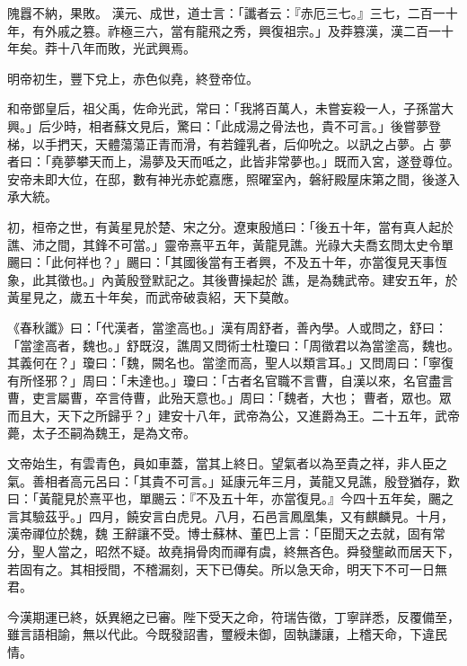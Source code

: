 \begin{pinyinscope}
 隗囂不納，果敗。
 漢元、成世，道士言：「讖者云：『赤厄三七。』三七，二百一十年，有外戚之篡。祚極三六，當有龍飛之秀，興復祖宗。」及莽篡漢，漢二百一十年矣。莽十八年而敗，光武興焉。



 明帝初生，豐下兌上，赤色似堯，終登帝位。



 和帝鄧皇后，祖父禹，佐命光武，常曰：「我將百萬人，未嘗妄殺一人，子孫當大興。」后少時，相者蘇文見后，驚曰：「此成湯之骨法也，貴不可言。」後嘗夢登梯，以手捫天，天體蕩蕩正青而滑，有若鐘乳者，后仰吮之。以訊之占夢。占
 夢者曰：「堯夢攀天而上，湯夢及天而呧之，此皆非常夢也。」既而入宮，遂登尊位。安帝未即大位，在邸，數有神光赤蛇嘉應，照曜室內，磐紆殿屋床第之間，後遂入承大統。



 初，桓帝之世，有黃星見於楚、宋之分。遼東殷馗曰：「後五十年，當有真人起於譙、沛之間，其鋒不可當。」靈帝熹平五年，黃龍見譙。光祿大夫喬玄問太史令單颺曰：「此何祥也？」颺曰：「其國後當有王者興，不及五十年，亦當復見天事恆象，此其徵也。」內黃殷登默記之。其後曹操起於
 譙，是為魏武帝。建安五年，於黃星見之，歲五十年矣，而武帝破袁紹，天下莫敵。



 《春秋讖》曰：「代漢者，當塗高也。」漢有周舒者，善內學。人或問之，舒曰：「當塗高者，魏也。」舒既沒，譙周又問術士杜瓊曰：「周徵君以為當塗高，魏也。其義何在？」瓊曰：「魏，闕名也。當塗而高，聖人以類言耳。」又問周曰：「寧復有所怪邪？」周曰：「未達也。」瓊曰：「古者名官職不言曹，自漢以來，名官盡言曹，吏言屬曹，卒言侍曹，此殆天意也。」周曰：「魏者，大也；
 曹者，眾也。眾而且大，天下之所歸乎？」建安十八年，武帝為公，又進爵為王。二十五年，武帝薨，太子丕嗣為魏王，是為文帝。



 文帝始生，有雲青色，員如車蓋，當其上終日。望氣者以為至貴之祥，非人臣之氣。善相者高元呂曰：「其貴不可言。」延康元年三月，黃龍又見譙，殷登猶存，歎曰：「黃龍見於熹平也，單颺云：『不及五十年，亦當復見。』今四十五年矣，颺之言其驗茲乎。」四月，饒安言白虎見。八月，石邑言鳳凰集，又有麒麟見。十月，漢帝禪位於魏，魏
 王辭讓不受。博士蘇林、董巴上言：「臣聞天之去就，固有常分，聖人當之，昭然不疑。故堯捐骨肉而禪有虞，終無吝色。舜發壟畝而居天下，若固有之。其相授間，不稽漏刻，天下已傳矣。所以急天命，明天下不可一日無君。



 今漢期運已終，妖異絕之已審。陛下受天之命，符瑞告徵，丁寧詳悉，反覆備至，雖言語相諭，無以代此。今既發詔書，璽綬未御，固執謙讓，上稽天命，下違民情。




\end{pinyinscope}
